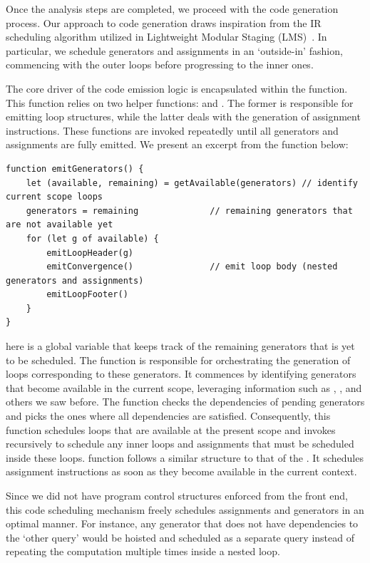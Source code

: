 \documentclass[runningheads]{llncs}
\begin{document}
Once the analysis steps are completed, we proceed with the code
generation process.
Our approach to code generation draws inspiration from the IR scheduling
algorithm utilized in Lightweight Modular Staging (LMS)~\cite{lms}.
In particular, we schedule generators and assignments in an
`outside-in' fashion, commencing with the outer loops before
progressing to the inner ones.


The core driver of the code emission logic is encapsulated within
the  function. 
This function relies on two helper functions: 
and .
The former is responsible for emitting loop structures, while the
latter deals with the generation of assignment instructions.
These functions are invoked repeatedly until all generators and
assignments are fully emitted.
We present an excerpt from the  function below:

\begin{lstlisting}[style=JavaScript, columns=flexible]
function emitGenerators() {
    let (available, remaining) = getAvailable(generators) // identify current scope loops
    generators = remaining              // remaining generators that are not available yet
    for (let g of available) {
        emitLoopHeader(g)
        emitConvergence()               // emit loop body (nested generators and assignments)
        emitLoopFooter()
    }
}
\end{lstlisting}

 here is a global variable that keeps track of the
remaining generators that is yet to be scheduled.
The  function is responsible for orchestrating the
generation of loops corresponding to these generators.
It commences by identifying generators that become available in the
current scope, leveraging information such as ,
, and others we saw before.
The  function checks the dependencies of pending
generators and picks the ones where all dependencies are satisfied.
Consequently, this function schedules loops that are available at the
present scope and invokes  recursively to schedule
any inner loops and assignments that must be scheduled inside these loops.
 function follows a similar structure to that of
the .
It schedules assignment instructions as soon as they become available in
the current context.

Since we did not have program control structures enforced from the front end,
this code scheduling mechanism freely schedules assignments and generators
in an optimal manner.
For instance, any generator that does not have dependencies to the `other query'
would be hoisted and scheduled as a separate query instead of repeating the
computation multiple times inside a nested loop.
\end{document}

